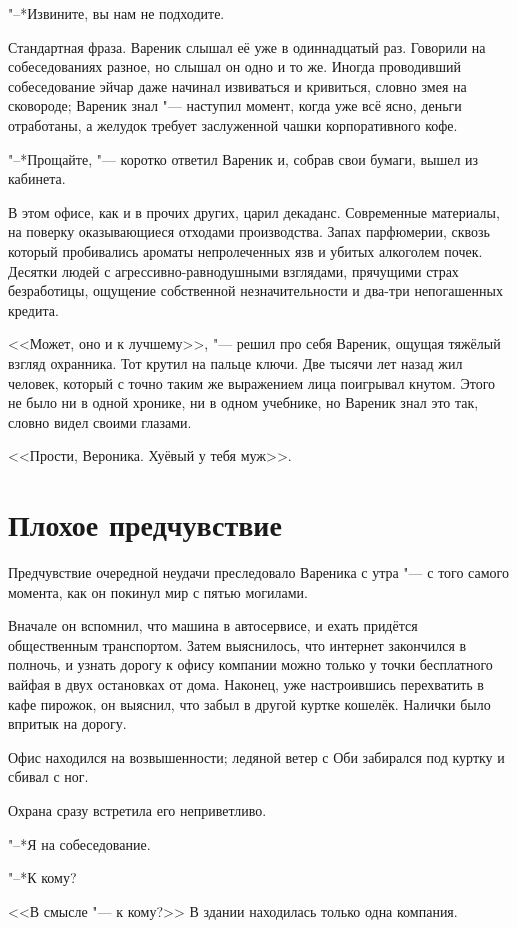 "--*Извините, вы нам не подходите.

Стандартная фраза.
Вареник слышал её уже в одиннадцатый раз.
Говорили на собеседованиях разное, но слышал он одно и то же.
Иногда проводивший собеседование эйчар даже начинал извиваться и кривиться, словно змея на сковороде;
Вареник знал "--- наступил момент, когда уже всё ясно, деньги отработаны, а желудок требует заслуженной чашки корпоративного кофе.

"--*Прощайте, "--- коротко ответил Вареник и, собрав свои бумаги, вышел из кабинета.

В этом офисе, как и в прочих других, царил декаданс.
Современные материалы, на поверку оказывающиеся отходами производства.
Запах парфюмерии, сквозь который пробивались ароматы непролеченных язв и убитых алкоголем почек.
Десятки людей с агрессивно-равнодушными взглядами, прячущими страх безработицы, ощущение собственной незначительности и два-три непогашенных кредита.

<<Может, оно и к лучшему>>, "--- решил про себя Вареник, ощущая тяжёлый взгляд охранника.
Тот крутил на пальце ключи.
Две тысячи лет назад жил человек, который с точно таким же выражением лица поигрывал кнутом.
Этого не было ни в одной хронике, ни в одном учебнике, но Вареник знал это так, словно видел своими глазами.

<<Прости, Вероника.
Хуёвый у тебя муж>>.

\section{Плохое предчувствие}

Предчувствие очередной неудачи преследовало Вареника с утра "--- с того самого момента, как он покинул мир с пятью могилами.

Вначале он вспомнил, что машина в автосервисе, и ехать придётся общественным транспортом.
Затем выяснилось, что интернет закончился в полночь, и узнать дорогу к офису компании можно только у точки бесплатного вайфая в двух остановках от дома.
Наконец, уже настроившись перехватить в кафе пирожок, он выяснил, что забыл в другой куртке кошелёк.
Налички было впритык на дорогу.

Офис находился на возвышенности;
ледяной ветер с Оби забирался под куртку и сбивал с ног.

Охрана сразу встретила его неприветливо.

"--*Я на собеседование.

"--*К кому?

<<В смысле "--- к кому?>>
В здании находилась только одна компания.

